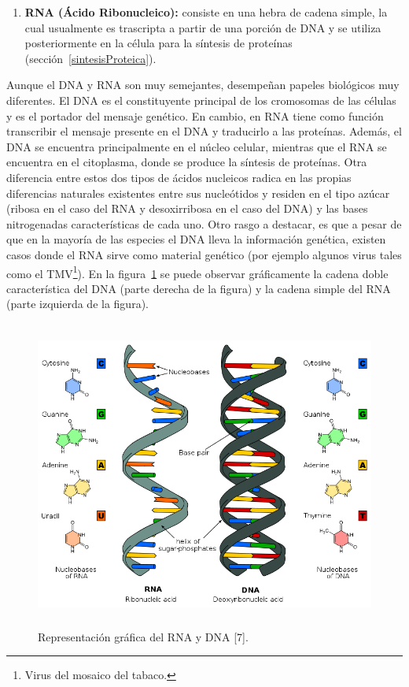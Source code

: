 \begin{itemize}
\begin{enumerate}
			\item \textbf{RNA (Ácido Ribonucleico):} consiste en una hebra de cadena simple, la cual usualmente es trascripta a partir de una porción de DNA y se utiliza posteriormente en la célula para la síntesis de proteínas (sección~\ref{sintesisProteica}).			
		\end{enumerate}				
	Aunque el DNA y RNA son muy semejantes, desempeñan papeles biológicos muy diferentes. El DNA es el constituyente principal de los cromosomas de las células y es el portador del mensaje genético. En cambio, en RNA tiene como función transcribir el mensaje presente en el DNA y traducirlo a las proteínas. 
    Además, el DNA se encuentra principalmente en el núcleo celular, mientras que el RNA se encuentra en el citoplasma, donde se produce la síntesis de proteínas.							
	Otra diferencia entre estos dos tipos de ácidos nucleicos radica en las propias diferencias naturales existentes entre sus nucleótidos y residen en el tipo azúcar (ribosa en el caso del RNA y desoxirribosa en el caso del DNA) y las bases nitrogenadas características de cada uno.
	Otro rasgo a destacar, es que a pesar de que en la mayoría de las especies el DNA lleva la información genética, existen casos donde el RNA sirve como material genético (por ejemplo algunos virus tales como el TMV\footnote{Virus del mosaico del tabaco.}). En la figura~\ref{DnaRna} se puede observar gráficamente la cadena doble característica del DNA (parte derecha de la figura) y la cadena simple del RNA (parte izquierda de la figura).	
					
	\begin{figure} [h]
		\begin{center}
		   \includegraphics[width=5.0209in,height=4.0000in]{image/ARN-ADN.png}
		   \caption{Representación gráfica del RNA y DNA [7].}			
		   \label{DnaRna}
		\end{center}
	\end{figure}	


\end{itemize}
